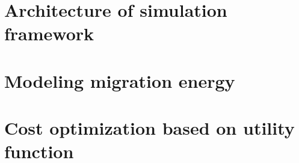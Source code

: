 

\section{Architecture of simulation framework}

\section{Modeling migration energy}

\section{Cost optimization based on utility function}


